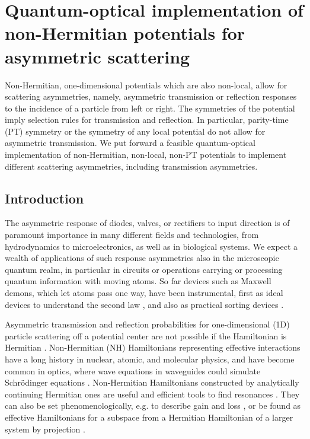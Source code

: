 
\chapter{Quantum-optical implementation of non-Hermitian potentials for asymmetric scattering}
\label{ChapterPhysicalImplementation}
%
Non-Hermitian, one-dimensional  potentials which are also non-local,
allow for scattering asymmetries, namely, asymmetric transmission or reflection responses to the incidence of a particle from left or right.
The  symmetries of the potential
imply selection rules for transmission and reflection. In particular, parity-time (PT)
symmetry or the symmetry  of any local potential do not allow for asymmetric transmission.
We put forward a feasible  quantum-optical implementation
of non-Hermitian, non-local, non-PT potentials to implement different scattering asymmetries, including transmission
asymmetries.
%
\newpage
%
\section{Introduction}
The asymmetric response of diodes, valves, or rectifiers to input direction is of paramount importance in many different fields and technologies, from hydrodynamics  to microelectronics,  as well as in biological systems. We  expect a wealth of applications of such response asymmetries also in the microscopic quantum realm, in particular in  circuits or operations carrying or processing quantum information with moving atoms.
So far  devices such as Maxwell demons, which  let atoms pass one way, have  been instrumental, first as ideal devices to  understand the second law \cite{Maxwell1875,Rex1990}, and also  as practical sorting devices \cite{Ruschhaupt2004,Raizen2005,Dudarev2005,Ruschhaupt2006a,Ruschhaupt2006,Ruschhaupt2006b,Ruschhaupt2007,Raizen2009,Jerkins2010}.

Asymmetric transmission and reflection
probabilities for one-dimensional (1D) particle scattering off  a potential center are not possible if the Hamiltonian is Hermitian \cite{Muga2004,Mostafazadeh2018}.
Non-Hermitian (NH) Hamiltonians representing effective interactions have a long history in nuclear, atomic, and molecular physics, and have become common in optics, where wave equations in waveguides could simulate  Schr\"odinger equations \cite{Ruschhaupt2005,Longhi2017a,Konotop2016}.
%
Non-Hermitian Hamiltonians constructed by analytically continuing Hermitian ones are useful and efficient tools to find resonances \cite{Moiseyev2011}.
They can also be set phenomenologically, e.g. to describe gain and loss
\cite{Ruschhaupt2005},
or be found as effective Hamiltonians for a subspace from a Hermitian Hamiltonian of a larger system
by projection \cite{Feshbach1958,Ruschhaupt2004,Muga2004}.
%


